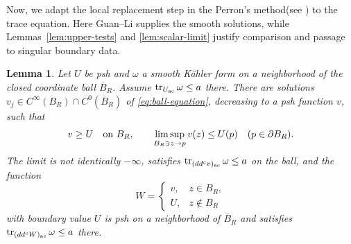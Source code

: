 \documentclass[reqno]{amsart}
\numberwithin{equation}{section}
\newtheorem{lemma}[theorem]{Lemma}
\theoremstyle{definition}
\DeclareMathOperator{\tr}{tr}
\newcommand{\ddc}{dd^c}
\begin{document}
Now, we adapt the local replacement step in the
Perron's method(see
\cite[Sections~5--6]{BT76}) to the trace equation.
Here Guan--Li supplies the smooth solutions, while
Lemmas~\ref{lem:upper-tests} and
\ref{lem:scalar-limit} justify comparison and
passage to singular boundary data.
\begin{lemma}\label{lem:replacement}
Let $U$ be psh and $\omega$ a smooth K\"ahler form on a
neighborhood of the closed coordinate ball $\overline B_R$.
Assume $\tr_{U_{\rm ac}}\omega\leq a$ there.
There are solutions
$v_j\in C^\infty(B_R)\cap C^0(\overline B_R)$ of
\eqref{eq:ball-equation}, decreasing to a psh
function $v$, such that
\begin{equation}\label{eq:replacement}
v\geq U\quad\hbox{on }B_R,\qquad
\limsup_{B_R\ni z\to p}v(z)\leq U(p)
\quad(p\in\partial B_R).
\end{equation}
The limit is not identically $-\infty$, satisfies $\tr_{(\ddc v)_{\rm ac}}\omega\leq a$ on the ball, and the function
\begin{equation}\label{eq:replaced-equation}
W=\begin{cases}v,&z\in B_R,\\ U,&z\notin B_R\end{cases}
\end{equation}
with boundary value $U$ is psh on a neighborhood of $\overline B_R$ and satisfies $\tr_{(\ddc W)_{\rm ac}}\omega\leq a$ there.
\end{lemma}
\end{document}

